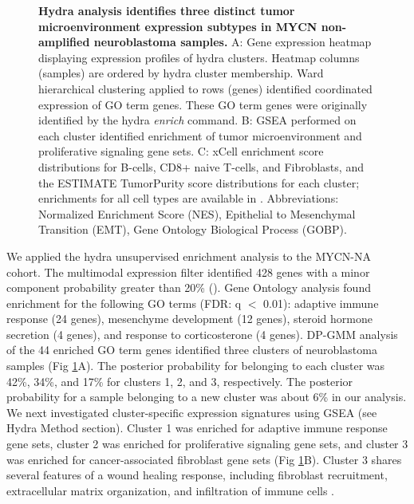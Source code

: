 \documentclass[10pt,letterpaper]{article}
\begin{document}
\begin{figure}[!h]
	\caption{{\bf Hydra analysis identifies three distinct tumor microenvironment expression subtypes in MYCN non-amplified neuroblastoma samples.}
	A: Gene expression heatmap displaying expression profiles of hydra clusters. Heatmap columns (samples) are ordered by hydra cluster membership. Ward hierarchical clustering applied to rows (genes) identified coordinated expression of GO term genes. These GO term genes were originally identified by the hydra \textit{enrich} command. B: GSEA performed on each cluster identified enrichment of tumor microenvironment and proliferative signaling gene sets. C: xCell enrichment score distributions for B-cells, CD8+ naive T-cells, and Fibroblasts, and the ESTIMATE TumorPurity score distributions for each cluster; enrichments for all cell types are available in . Abbreviations: Normalized Enrichment Score (NES), Epithelial to Mesenchymal Transition (EMT), Gene Ontology Biological Process (GOBP).
	\label{MYCN-NA}}
\end{figure}

We applied the hydra unsupervised enrichment analysis to the MYCN-NA cohort. The multimodal expression filter identified 428 genes with a minor component probability greater than 20\% (). Gene Ontology analysis found enrichment for the following GO terms (FDR: q $<$ 0.01): adaptive immune response (24 genes), mesenchyme development (12 genes), steroid hormone secretion (4 genes), and response to corticosterone (4 genes). DP-GMM analysis of the 44 enriched GO term genes identified three clusters of neuroblastoma samples (Fig \ref{MYCN-NA}A). The posterior probability for belonging to each cluster was 42\%, 34\%, and 17\% for clusters 1, 2, and 3, respectively. The posterior probability for a sample belonging to a new cluster was about 6\% in our analysis. We next investigated cluster-specific expression signatures using GSEA (see Hydra Method section). Cluster 1 was enriched for adaptive immune response gene sets, cluster 2 was enriched for proliferative signaling gene sets, and cluster 3 was enriched for cancer-associated fibroblast gene sets (Fig \ref{MYCN-NA}B). Cluster 3 shares several features of a wound healing response, including fibroblast recruitment, extracellular matrix organization, and infiltration of immune cells \cite{fosterEvolvingRelationshipWound}. 
\end{document}
